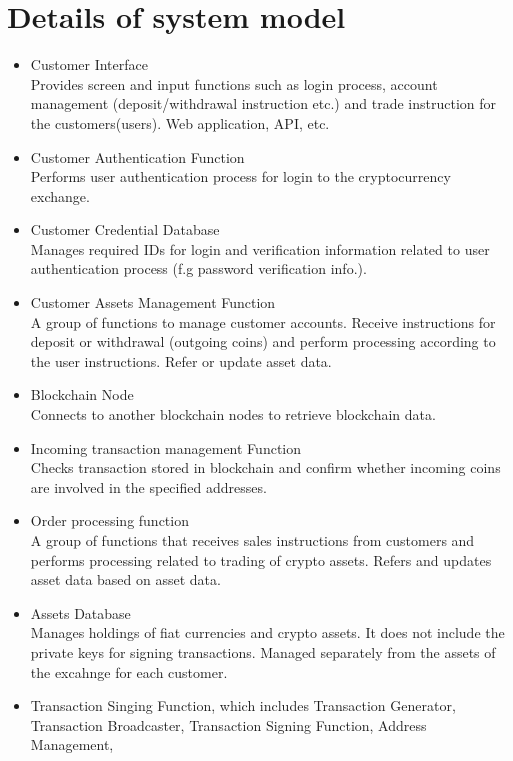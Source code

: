 \section{Details of system model}
\label{appendix_system_model}
\begin{itemize}
 \item Customer Interface\\
       Provides screen and input functions such as login process, account management (deposit/withdrawal instruction etc.) and trade instruction for the customers(users). Web application, API, etc.
 \item Customer Authentication Function\\
       Performs user authentication process for login to the cryptocurrency exchange.
 \item Customer Credential Database\\
       Manages required IDs for login and verification information related to user authentication process (f.g password verification info.).
 \item Customer Assets Management Function\\
       A group of functions to manage customer accounts. Receive instructions for deposit or withdrawal (outgoing coins) and perform processing according to the user instructions. Refer or update asset data.
 \item Blockchain Node\\
       Connects to another blockchain nodes to retrieve blockchain data.
 \item Incoming transaction management Function\\
       Checks transaction stored in blockchain and confirm whether incoming coins are involved in the specified addresses.
 \item Order processing function\\
       A group of functions that receives sales instructions from customers and performs processing related to trading of crypto assets. Refers and updates asset data based on asset data.
 \item Assets Database\\
       Manages holdings of fiat currencies and crypto assets. It does not include the private keys for signing transactions. Managed separately from the assets of the excahnge for each customer.
 \item Transaction Singing Function, which includes Transaction Generator, Transaction Broadcaster, Transaction Signing Function, Address Management,

\end{itemize}
